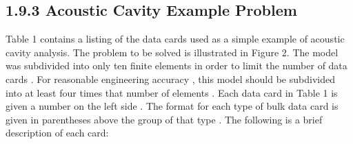 \documentclass{article}
\begin{document}
\subsection{1.9.3 Acoustic Cavity Example Problem}

Table 1 contains a listing of the data cards used as a simple example of acoustic cavity
analysis. The problem to be solved is illustrated in Figure 2. The model was subdivided into
only ten finite elements in order to limit the number of data cards . For reasonable engineering
accuracy , this model should be subdivided into at least four times that number of elements .
Each data card in Table 1 is given a number on the left side .
The format for each type of
bulk data card is given in parentheses above the group of that type . The following is a brief
description of each card:
\end{document}
